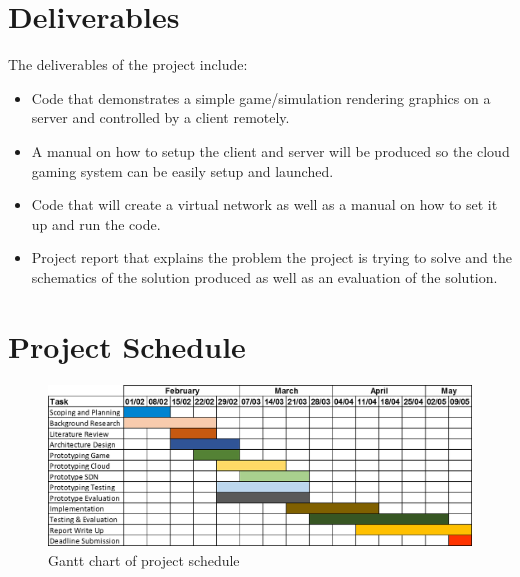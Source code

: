 \section{Deliverables}
The deliverables of the project include:
\begin{itemize}
  \item Code that demonstrates a simple game/simulation rendering graphics on a server and controlled by a client remotely.
  \item A manual on how to setup the client and server will be produced so the cloud gaming system can be easily setup and launched. 
  \item Code that will create a virtual network as well as a manual on how to set it up and run the code.
  \item Project report that explains the problem the project is trying to solve and the schematics of the solution produced as well as an evaluation of the solution.
\end{itemize}

\section{Project Schedule}
\begin{figure}[h]
 \includegraphics[width=\linewidth]{images/gantt.png}
 \caption{Gantt chart of project schedule}
 \label{fig:schedule}
\end{figure}

